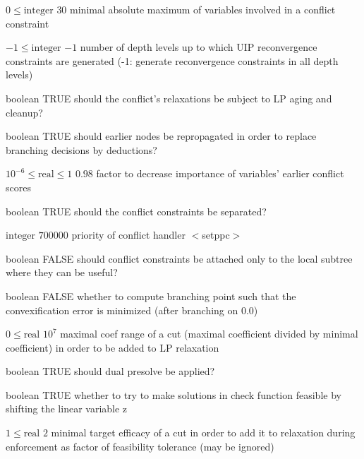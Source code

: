 %
{$0\leq\textrm{integer}$}%
{$30$}%
{minimal absolute maximum of variables involved in a conflict constraint}%
{}

%
{$-1\leq\textrm{integer}$}%
{$-1$}%
{number of depth levels up to which UIP reconvergence constraints are generated (-1: generate reconvergence constraints in all depth levels)}%
{}

%
{boolean}%
{TRUE}%
{should the conflict's relaxations be subject to LP aging and cleanup?}%
{}

%
{boolean}%
{TRUE}%
{should earlier nodes be repropagated in order to replace branching decisions by deductions?}%
{}

%
{$10^{- 6}\leq\textrm{real}\leq1$}%
{$0.98$}%
{factor to decrease importance of variables' earlier conflict scores}%
{}

%
{boolean}%
{TRUE}%
{should the conflict constraints be separated?}%
{}

%
{$\textrm{integer}$}%
{$700000$}%
{priority of conflict handler $<$setppc$>$}%
{}

%
{boolean}%
{FALSE}%
{should conflict constraints be attached only to the local subtree where they can be useful?}%
{}

%
{boolean}%
{FALSE}%
{whether to compute branching point such that the convexification error is minimized (after branching on 0.0)}%
{}

%
{$0\leq\textrm{real}$}%
{$10^{  7}$}%
{maximal coef range of a cut (maximal coefficient divided by minimal coefficient) in order to be added to LP relaxation}%
{}

%
{boolean}%
{TRUE}%
{should dual presolve be applied?}%
{}

%
{boolean}%
{TRUE}%
{whether to try to make solutions in check function feasible by shifting the linear variable z}%
{}

%
{$1\leq\textrm{real}$}%
{$2$}%
{minimal target efficacy of a cut in order to add it to relaxation during enforcement as factor of feasibility tolerance (may be ignored)}%
{}

